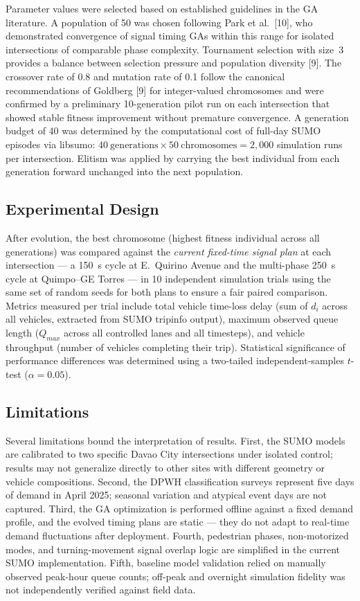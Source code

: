 \documentclass[a4paper,10pt]{article}
\begin{document}
	Parameter values were selected based on established guidelines in the GA literature. A population of 50 was chosen following Park et al.~[10], who demonstrated convergence of signal timing GAs within this range for isolated intersections of comparable phase complexity. Tournament selection with size~3 provides a balance between selection pressure and population diversity [9]. The crossover rate of 0.8 and mutation rate of 0.1 follow the canonical recommendations of Goldberg [9] for integer-valued chromosomes and were confirmed by a preliminary 10-generation pilot run on each intersection that showed stable fitness improvement without premature convergence. A generation budget of 40 was determined by the computational cost of full-day SUMO episodes via libsumo: $40~\mathrm{generations} \times 50~\mathrm{chromosomes} = 2{,}000$ simulation runs per intersection. Elitism was applied by carrying the best individual from each generation forward unchanged into the next population.
	
	\subsection{Experimental Design}
	After evolution, the best chromosome (highest fitness individual across all generations) was compared against the \textit{current fixed-time signal plan} at each intersection --- a 150~s cycle at E.~Quirino Avenue and the multi-phase 250~s cycle at Quimpo--GE Torres --- in 10 independent simulation trials using the same set of random seeds for both plans to ensure a fair paired comparison. Metrics measured per trial include total vehicle time-loss delay (sum of $d_i$ across all vehicles, extracted from SUMO tripinfo output), maximum observed queue length ($Q_{max}$ across all controlled lanes and all timesteps), and vehicle throughput (number of vehicles completing their trip). Statistical significance of performance differences was determined using a two-tailed independent-samples $t$-test ($\alpha = 0.05$).

	\subsection{Limitations}
	Several limitations bound the interpretation of results. First, the SUMO models are calibrated to two specific Davao City intersections under isolated control; results may not generalize directly to other sites with different geometry or vehicle compositions. Second, the DPWH classification surveys represent five days of demand in April 2025; seasonal variation and atypical event days are not captured. Third, the GA optimization is performed offline against a fixed demand profile, and the evolved timing plans are static --- they do not adapt to real-time demand fluctuations after deployment. Fourth, pedestrian phases, non-motorized modes, and turning-movement signal overlap logic are simplified in the current SUMO implementation. Fifth, baseline model validation relied on manually observed peak-hour queue counts; off-peak and overnight simulation fidelity was not independently verified against field data.
	
\end{document}
